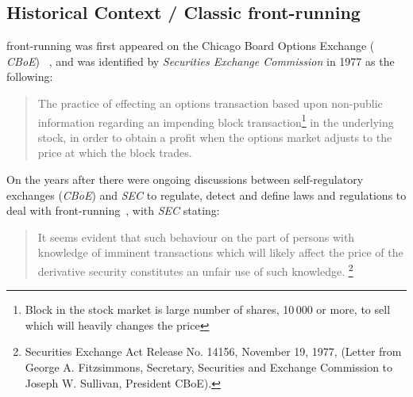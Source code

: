 \subsection{Historical Context / Classic front-running}
front-running was first appeared on the Chicago Board Options Exchange ( \textit{CBoE}) ~\cite{markham1988front}, and was identified by \textit{Securities Exchange Commission} in 1977 as the following:
\begin{quote}
The practice of effecting an options transaction based upon non-public information regarding an impending block transaction\footnote{Block in the stock market is large number of shares, 10\,000 or more, to sell which will heavily changes the price} in the underlying stock, in order to obtain a profit when the options market adjusts to the price at which the block trades. ~\cite{sec1978optionsmarket}
\end{quote} 



On the years after there were ongoing discussions between self-regulatory exchanges (\eg \textit{CBoE}) and  \textit{SEC} to regulate, detect and define laws and regulations to deal with front-running~\cite{markham1988front}, with \textit{SEC} stating: 
\begin{quote}
It seems evident that such behaviour on the part of persons with knowledge of imminent transactions which will likely affect the price of the derivative security constitutes an unfair use of such knowledge. \footnote{Securities Exchange Act Release No. 14156, November 19, 1977, (Letter from George A. Fitzsimmons, Secretary, Securities and Exchange Commission to Joseph W. Sullivan, President  CBoE).}
\end{quote} 

